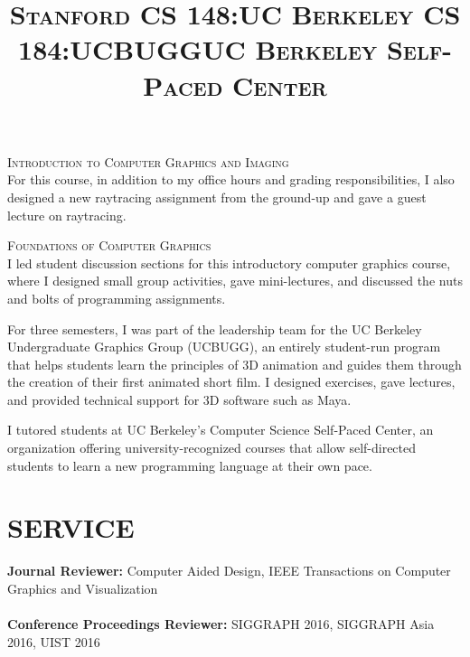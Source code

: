 \documentclass[line,margin]{res}
\begin{document}
\begin{resume}
\title{\textsc{Stanford CS 148:}}
\begin{position}
\textsc{Introduction to Computer Graphics and Imaging}\\
For this course, in addition to my office hours and grading responsibilities, I also designed a new raytracing assignment from the ground-up and gave a guest lecture on raytracing.
\end{position}

\title{\textsc{UC Berkeley CS 184:}}
\begin{position}
\textsc{Foundations of Computer Graphics}\\
I led student discussion sections for this introductory computer graphics course, where I designed small group activities, gave mini-lectures, and discussed the nuts and bolts of programming assignments.
\end{position}

\title{\textsc{UCBUGG}}
\begin{position}
For three semesters, I was part of the leadership team for the UC Berkeley Undergraduate Graphics Group (UCBUGG), an entirely student-run program that helps students learn the principles of 3D animation and guides them through the creation of their first animated short film. I designed exercises, gave lectures, and provided technical support for 3D software such as Maya.
\end{position}

\title{\textsc{UC Berkeley Self-Paced Center}}
\begin{position}
I tutored students at UC Berkeley's Computer Science Self-Paced Center, an organization offering university-recognized courses that allow self-directed students to learn a new programming language at their own pace.
\end{position}


\section{SERVICE}

\textbf{Journal Reviewer: } Computer Aided Design, IEEE Transactions on Computer Graphics and Visualization
\\ \\
\textbf{Conference Proceedings Reviewer: } SIGGRAPH 2016, SIGGRAPH Asia 2016, UIST 2016





\end{resume}
\end{document}
